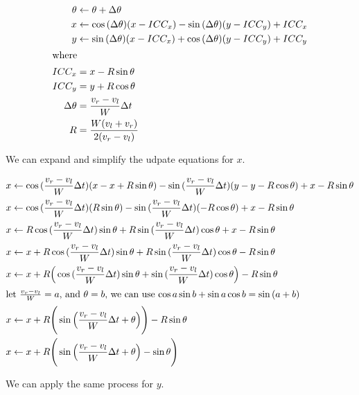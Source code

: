 \documentclass{article}
\begin{document}
\begin{align}
 \theta &\leftarrow \theta + \Delta\theta \\
  x &\leftarrow \cos{(\Delta\theta)}(x-ICC_x)-\sin{(\Delta\theta)}(y-ICC_y) + ICC_x \\
  y &\leftarrow \sin{(\Delta\theta)}(x-ICC_x)+\cos{(\Delta\theta)}(y-ICC_y) + ICC_y \\
\shortintertext{where}
  ICC_x &= x-R\sin{\theta} \\
  ICC_y &= y+R\cos{\theta} \\
  \Delta\theta &= \frac{v_r-v_l}{W}\Delta t \\
  R &= \frac{W(v_l+v_r)}{2(v_r-v_l)}
\end{align}

We can expand and simplify the udpate equations for $x$.

\begin{align}
  x &\leftarrow \cos{(\frac{v_r-v_l}{W}\Delta t)}(x-x+R\sin{\theta})-\sin{(\frac{v_r-v_l}{W}\Delta t)}(y-y-R\cos{\theta}) + x-R\sin{\theta} \\
  x &\leftarrow \cos{(\frac{v_r-v_l}{W}\Delta t)}(R\sin{\theta})-\sin{(\frac{v_r-v_l}{W}\Delta t)}(-R\cos{\theta}) + x-R\sin{\theta} \\
  x &\leftarrow R\cos{(\frac{v_r-v_l}{W}\Delta t)}\sin{\theta}+R\sin{(\frac{v_r-v_l}{W}\Delta t)}\cos{\theta} + x-R\sin{\theta} \\
  x &\leftarrow x+R\cos{(\frac{v_r-v_l}{W}\Delta t)}\sin{\theta}+R\sin{(\frac{v_r-v_l}{W}\Delta t)}\cos{\theta}-R\sin{\theta} \\
  x &\leftarrow x+R\Big(\cos{(\frac{v_r-v_l}{W}\Delta t)}\sin{\theta}+\sin{(\frac{v_r-v_l}{W}\Delta t)}\cos{\theta}\Big)-R\sin{\theta} \\
  \shortintertext{let $\frac{v_r-v_l}{W}=a$, and $\theta=b$, we can use $\cos{a}\sin{b}+\sin{a}\cos{b}=\sin{(a+b)}$}
  x &\leftarrow x+R\Bigg(\sin{\Big(\frac{v_r-v_l}{W}\Delta t+\theta}\Big)\Bigg)-R\sin{\theta} \\
  x &\leftarrow x+R\Bigg(\sin{\Big(\frac{v_r-v_l}{W}\Delta t+\theta}\Big)-\sin{\theta}\Bigg) \\
\end{align}

We can apply the same process for $y$.
\end{document}
